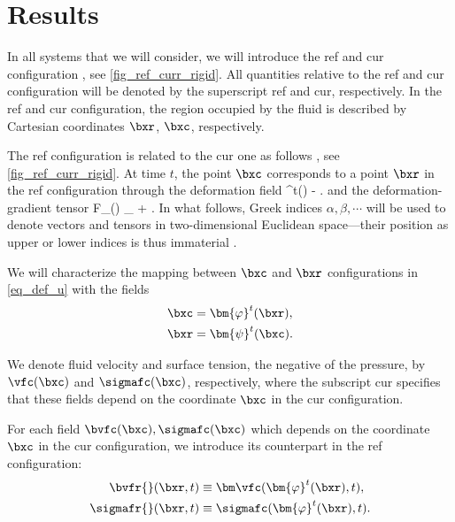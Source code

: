 \section{Results}\label{sec_results}



In all  systems that we will consider, we will introduce the \ac{ref} and \ac{cur} configuration \cite{kamenskyLectureNotesMAE,landauTheoryElasticity1986,slaughterLinearizedTheoryElasticity2002}, see \cref{fig_ref_curr_rigid}. All quantities relative to the \ac{ref} and \ac{cur} configuration will be denoted by the superscript \ac{ref} and \ac{cur}, respectively.
In the \ac{ref} and \ac{cur} configuration, the region occupied by the fluid is described by Cartesian coordinates $\bxr$, $\bxc$, respectively.

The \ac{ref} configuration is related to the \ac{cur} one as follows \cite{kamenskyLectureNotesMAE}, see \cref{fig_ref_curr_rigid}. At  time $t$, the point $\bxc$  corresponds to a point $\bxr$ in the \ac{ref} configuration through the deformation field \cite{landauFluidMechanics1987}
\be\label{eq_def_u}
\budom^t(\bxr) \equiv \bxc - \bxr.
\ee
and the deformation-gradient tensor
\be
\label{eq_def_F}
F_{\alpha \beta}(\bu) \equiv \delta_{\alpha \beta} + .
\ee
In what follows, Greek indices $\alpha, \beta, \cdots$ will be used to denote vectors and tensors in  two-dimensional Euclidean space---their position as upper or lower indices is thus immaterial \cite{marchiafavaAppuntiDiGeometria2005,landauTheoryElasticity1986}.

We will characterize  the mapping between $\bxc$ and $\bxr$ configurations in \cref{eq_def_u} with the fields
\begin{align}\label{eq_def_phi}
        \bxc & = \bm{\varphi}^t(\bxr), \\
        \label{eq_def_psi}
        \bxr & = \bm{\psi}^t(\bxc).
\end{align}

We denote fluid velocity and surface tension, the negative of the pressure, by $\vfc(\bxc)$ and $\sigmafc(\bxc)$, respectively, where the subscript \ac{cur} specifies that these fields depend on the coordinate $\bxc$ in the \ac{cur} configuration.

For each field $\bvfc({\bxc}), \sigmafc(\bxc)$ which depends on the coordinate $\bxc$ in the \ac{cur} configuration, we introduce its counterpart in the \ac{ref} configuration:
\begin{align}
        \label{eq_vf_ref}
        \bvfr{}(\bxr, t)    & \equiv {\bm \vfc}( \bm{\varphi}^t(\bxr), t), \\
        \label{eq_sigmaf_ref}
        \sigmafr{}(\bxr, t) & \equiv  \sigmafc( \bm{\varphi}^t(\bxr), t).
\end{align}


